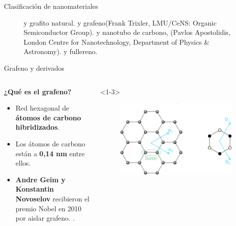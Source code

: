 \documentclass[aspectratio=169]{beamer}
\begin{document}
\begin{frame}{Clasificación de nanomateriales}
\begin{figure}
\begin{subfigure}[b]{0.15\textwidth}
				\caption{}
				\label{fig:fullerene_image}
			\end{subfigure}
			\caption[Alótropos del carbono mostrando las diferentes dimensionalidades de los nanomateriales]{ y  grafito natural.  y  grafeno(Frank Trixler, LMU/CeNS: Organic Semiconductor Group).  y  nanotubo de carbono, (Pavlos Apostolidis, London Centre for Nanotechnology, Department of Physics \& Astronomy).  y  fullereno\citep{Gimenez2011}.}
			\label{fig:carbon_allotropes}
		\end{figure}
	\end{frame}

	\begin{frame}{Grafeno y derivados}
		\begin{columns}
			\begin{column}{0.6\textwidth}
				\only<1->\textbf{¿Qué es el grafeno?}
				\begin{itemize}[<+(1)->]
					\item Red hexagonal de \textbf{átomos de carbono hibridizados}.
					\item Los átomos de carbono están a \textbf{0,14 nm} entre ellos.
					\item \textbf{Andre Geim y Konstantin Novoselov} recibieron el premio Nobel en 2010 por aislar grafeno.  \citep{Novoselov2004}.
				\end{itemize}
			\end{column}
			\begin{column}{0.4\textwidth}
				\begin{onlyenv}<1-3>
					\begin{figure}
						\includegraphics[width=\textwidth]{graphene_lattice.pdf}

\end{figure}
\end{onlyenv}
\end{column}
\end{columns}
\end{frame}
\end{document}
